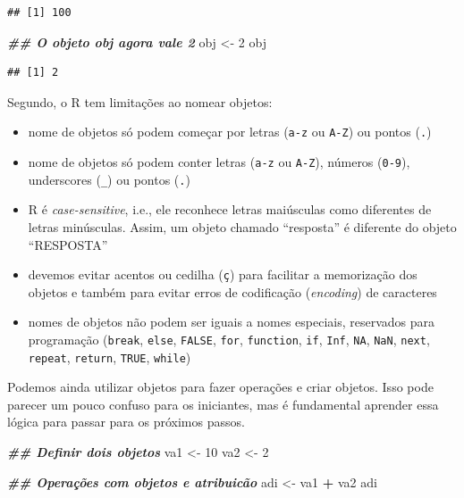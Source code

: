 \documentclass[
]{article}
\newenvironment{Shaded}{\begin{snugshade}}{\end{snugshade}}
\newcommand{\DecValTok}[1]{\textcolor[rgb]{0.00,0.00,0.81}{#1}}
\newcommand{\DocumentationTok}[1]{\textcolor[rgb]{0.56,0.35,0.01}{\textbf{\textit{#1}}}}
\newcommand{\NormalTok}[1]{#1}
\newcommand{\OtherTok}[1]{\textcolor[rgb]{0.56,0.35,0.01}{#1}}
\newcommand{\SpecialCharTok}[1]{\textcolor[rgb]{0.81,0.36,0.00}{\textbf{#1}}}
\providecommand{\tightlist}{%
  \setlength{\itemsep}{0pt}\setlength{\parskip}{0pt}}
\begin{document}
\begin{verbatim}
## [1] 100
\end{verbatim}

\begin{Shaded}
\begin{Highlighting}[]
\DocumentationTok{\#\# O objeto \textquotesingle{}obj\textquotesingle{} agora vale 2}
\NormalTok{obj }\OtherTok{\textless{}{-}} \DecValTok{2}
\NormalTok{obj}
\end{Highlighting}
\end{Shaded}

\begin{verbatim}
## [1] 2
\end{verbatim}

Segundo, o R tem limitações ao nomear objetos:

\begin{itemize}
\tightlist
\item
  nome de objetos só podem começar por letras (\texttt{a-z} ou \texttt{A-Z}) ou pontos (\texttt{.})
\item
  nome de objetos só podem conter letras (\texttt{a-z} ou \texttt{A-Z}), números (\texttt{0-9}), underscores (\texttt{\_}) ou pontos (\texttt{.})
\item
  R é \emph{case-sensitive}, i.e., ele reconhece letras maiúsculas como diferentes de letras minúsculas. Assim, um objeto chamado ``resposta'' é diferente do objeto ``RESPOSTA''
\item
  devemos evitar acentos ou cedilha (\texttt{ç}) para facilitar a memorização dos objetos e também para evitar erros de codificação (\emph{encoding}) de caracteres
\item
  nomes de objetos não podem ser iguais a nomes especiais, reservados para programação (\texttt{break}, \texttt{else}, \texttt{FALSE}, \texttt{for}, \texttt{function}, \texttt{if}, \texttt{Inf}, \texttt{NA}, \texttt{NaN}, \texttt{next}, \texttt{repeat}, \texttt{return}, \texttt{TRUE}, \texttt{while})
\end{itemize}

Podemos ainda utilizar objetos para fazer operações e criar objetos. Isso pode parecer um pouco confuso para os iniciantes, mas é fundamental aprender essa lógica para passar para os próximos passos.

\begin{Shaded}
\begin{Highlighting}[]
\DocumentationTok{\#\# Definir dois objetos}
\NormalTok{va1 }\OtherTok{\textless{}{-}} \DecValTok{10}
\NormalTok{va2 }\OtherTok{\textless{}{-}} \DecValTok{2}

\DocumentationTok{\#\# Operações com objetos e atribuicão}
\NormalTok{adi }\OtherTok{\textless{}{-}}\NormalTok{ va1 }\SpecialCharTok{+}\NormalTok{ va2}
\NormalTok{adi}
\end{Highlighting}
\end{Shaded}
\end{document}
